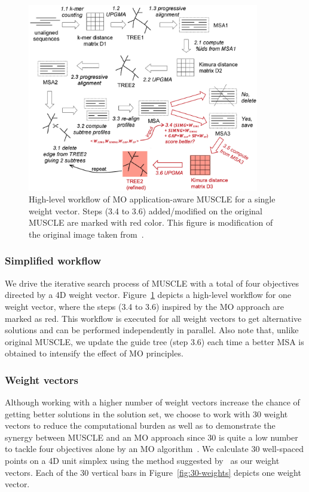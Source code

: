\begin{figure}[!htbp]
	\centering
	\includegraphics[width=0.9\textwidth]{Figure/ma-muscle}
	\caption{High-level workflow of MO application-aware MUSCLE for a single weight vector. Steps (3.4 to 3.6) added/modified on the original MUSCLE are marked with red color. This figure is modification of the original image taken from~\cite{edgar2004muscle}.}
	\label{fig:ma-muscle}
\end{figure}

\subsubsection{Simplified workflow}
We drive the iterative search process of MUSCLE with a total of four objectives directed by a 4D weight vector. Figure~\ref{fig:ma-muscle} depicts a high-level workflow for one weight vector, where the steps (3.4 to 3.6) inspired by the MO approach are marked as red. This workflow is executed for all weight vectors to get alternative solutions and can be performed independently in parallel. %
Also note that, unlike original MUSCLE, we update the guide tree (step 3.6) each time a better MSA is obtained to intensify the effect of MO principles.

\subsubsection{Weight vectors}
Although working with a higher number of weight vectors increase the chance of getting better solutions in the solution set, we choose to work with 30 weight vectors to reduce the computational burden as well as to demonstrate the synergy between MUSCLE and an MO approach since 30 is quite a low number to tackle four objectives alone by an MO algorithm~\cite{deb2014evolutionary}. We calculate 30 well-spaced points on a 4D unit simplex using the method suggested by~\cite{ref_dirs_energy} as our weight vectors. Each of the 30 vertical bars in Figure~\ref{fig:30-weights} depicts one weight vector. %


